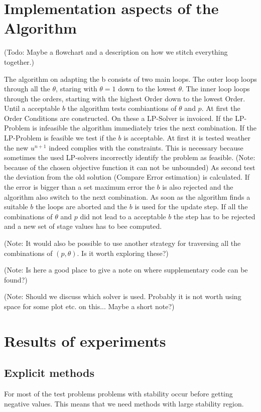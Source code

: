 \documentclass{article}
\begin{document}
\section{Implementation aspects of the Algorithm}

(Todo: Maybe a flowchart and a description on how we stitch everything together.) 

The algorithm on adapting the b consists of two main loops. The outer loop loops through all the $\theta$, staring with $\theta = 1$ down to the lowest $\theta$. The inner loop loops through the orders, starting with the highest Order down to the lowest Order. 
Until a acceptable $b$ the algorithm tests combiantions of $\theta$ and $p$. At first the Order Conditions are constructed. On these a LP-Solver is invoiced. If the LP-Problem is infeasible the algorithm immediately tries the next combination. If the LP-Problem is feasible we test if the $b$ is acceptable. At first it is tested weather the new $u^{n+1}$ indeed complies with the constraints. This is necessary because sometimes the used LP-solvers incorrectly identify the problem as feasible. (Note: because of the chosen objective function it can not be unbounded) As second test the deviation from the old solution (Compare Error estimation) is calculated. If the error is bigger than a set maximum error the $b$ is also rejected and the algorithm also switch to the next combination.
As soon as the algorithm finds a suitable $b$ the loops are aborted and the $b$ is used for the update step.
If all the combinations of $\theta$ and $p$ did not lead to a acceptable $b$ the step has to be rejected and a new set of stage values has to bee computed.

(Note: It would also be possible to use another strategy for traversing all the combinations of $(p,\theta)$. Is it worth exploring these?)

(Note: Is here a good place to give a note on where supplementary code can be found?)

(Note: Should we discuss which solver is used. Probably it is not worth using space for some plot etc. on this... Maybe a short note?)

 

\section{Results of experiments}
\subsection{Explicit methods}
For most of the test problems problems with stability occur before getting negative values. This means that we need methods with large stability region.
\end{document}
